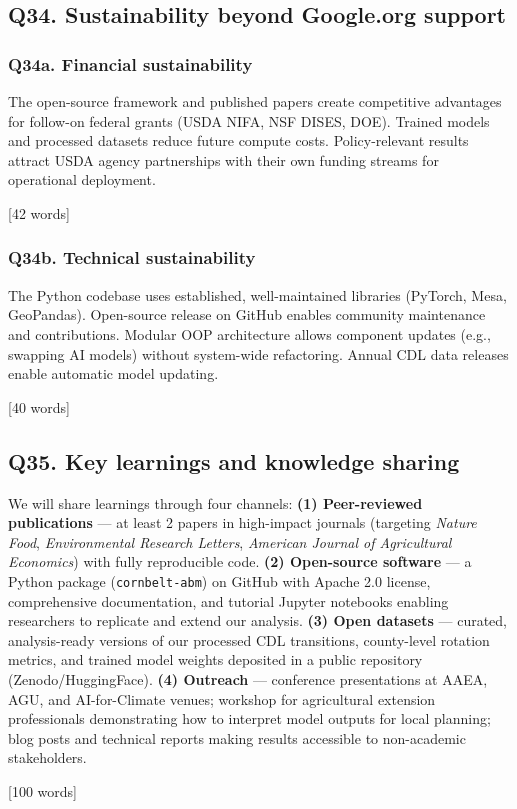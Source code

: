 \documentclass[11pt,letterpaper]{article}
\newcommand{\answer}[1]{%
    \vspace{0.2em}%
    \noindent\colorbox{answerbox}{\parbox{\dimexpr\textwidth-2\fboxsep}{%
        \vspace{0.4em}#1\vspace{0.4em}%
    }}%
    \vspace{0.5em}%
}
\newcommand{\wordcount}[1]{%
    \hfill{\scriptsize\textcolor{notegray}{[#1 words]}}%
}
\begin{document}
\subsection{Q34. Sustainability beyond Google.org support}

\subsubsection{Q34a. Financial sustainability}
\answer{The open-source framework and published papers create competitive advantages for follow-on federal grants (USDA NIFA, NSF DISES, DOE). Trained models and processed datasets reduce future compute costs. Policy-relevant results attract USDA agency partnerships with their own funding streams for operational deployment.}
\wordcount{42}

\subsubsection{Q34b. Technical sustainability}
\answer{The Python codebase uses established, well-maintained libraries (PyTorch, Mesa, GeoPandas). Open-source release on GitHub enables community maintenance and contributions. Modular OOP architecture allows component updates (e.g., swapping AI models) without system-wide refactoring. Annual CDL data releases enable automatic model updating.}
\wordcount{40}

\subsection{Q35. Key learnings and knowledge sharing}
\answer{We will share learnings through four channels: \textbf{(1) Peer-reviewed publications} --- at least 2 papers in high-impact journals (targeting \textit{Nature Food}, \textit{Environmental Research Letters}, \textit{American Journal of Agricultural Economics}) with fully reproducible code. \textbf{(2) Open-source software} --- a Python package (\texttt{cornbelt-abm}) on GitHub with Apache 2.0 license, comprehensive documentation, and tutorial Jupyter notebooks enabling researchers to replicate and extend our analysis. \textbf{(3) Open datasets} --- curated, analysis-ready versions of our processed CDL transitions, county-level rotation metrics, and trained model weights deposited in a public repository (Zenodo/HuggingFace). \textbf{(4) Outreach} --- conference presentations at AAEA, AGU, and AI-for-Climate venues; workshop for agricultural extension professionals demonstrating how to interpret model outputs for local planning; blog posts and technical reports making results accessible to non-academic stakeholders.}
\wordcount{100}
\end{document}
